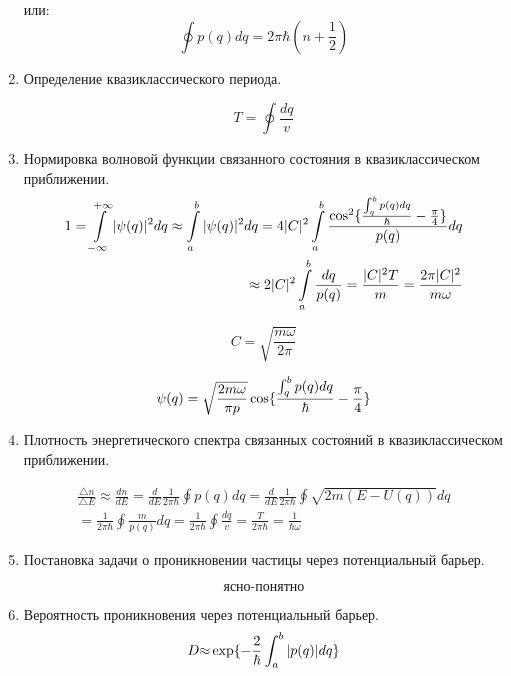 \documentclass{article}
\begin{document}
\begin{enumerate}
или: 
\begin{equation}
\oint p(q)dq=2\pi\hbar(n+\frac{1}{2})
\end{equation}


		\item {Определение квазиклассического периода.} 

\begin{equation}
T=\oint\frac{dq}{v}
\end{equation}


		\item {Нормировка волновой функции связанного состояния в квазиклассическом приближении.} 
\begin{equation}
\begin{split}
1=\intop_{-\infty}^{+\infty}|\psi(q)|^{2}dq\approx\intop_{a}^{b}|\psi(q)|^{2}dq=4|C|^{2}\intop_{a}^{b}\frac{\cos^{2}\{\frac{\intop_{q}^{b}p(q)dq}{\hbar}-\frac{\pi}{4}\}}{p(q)}dq \\
\approx2|C|^{2}\intop_{a}^{b}\frac{dq}{p(q)}=\frac{|C|^{2}T}{m}=\frac{2\pi|C|^{2}}{m\omega}
\end{split}
\end{equation}


\begin{equation}
C=\sqrt{\frac{m\omega}{2\pi}}
\end{equation}


\begin{equation}
\psi(q)=\sqrt{\frac{2m\omega}{\pi p}}\cos\{\frac{\intop_{q}^{b}p(q)dq}{\hbar}-\frac{\pi}{4}\}
\end{equation}


		\item {Плотность энергетического спектра связанных состояний в квазиклассическом приближении.} 

\begin{equation}
\begin{split}
\frac{\triangle n}{\triangle E}\approx\frac{dn}{dE}=\frac{d}{dE}\frac{1}{2\pi\hbar}\oint p(q)dq=\frac{d}{dE}\frac{1}{2\pi\hbar}\oint\sqrt{2m(E-U(q))}dq \\
=\frac{1}{2\pi\hbar}\oint\frac{m}{p(q)}dq=\frac{1}{2\pi\hbar}\oint\frac{dq}{v}=\frac{T}{2\pi\hbar}=\frac{1}{\hbar\omega}
\end{split}
\end{equation}


		\item {Постановка задачи о проникновении частицы через потенциальный барьер.} 

\begin{equation}
\text{ясно-понятно}
\end{equation}


		\item {Вероятность проникновения через потенциальный барьер.}
\begin{equation}
D\text{\ensuremath{\approx}}\exp\{-\frac{2}{\hbar}\int_{a}^{b}|p(q)|dq\}
\end{equation}
	\end{enumerate}
	
\end{document}
